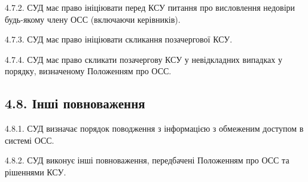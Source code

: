    4.7.2. СУД має право ініціювати перед КСУ питання про висловлення недовіри будь-якому члену ОСС (включаючи керівників).

    4.7.3. СУД має право ініціювати скликання позачергової КСУ.

    4.7.4. СУД має право скликати позачергову КСУ у невідкладних випадках у порядку, визначеному Положенням про ОСС.

\subsection*{4.8. Інші повноваження}
    4.8.1. СУД визначає порядок поводження з інформацією з обмеженим доступом в системі ОСС.

    4.8.2. СУД виконує інші повноваження, передбачені Положенням про ОСС та рішеннями КСУ. 
